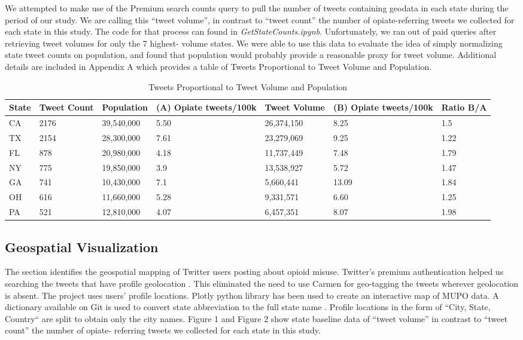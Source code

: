 \documentclass[sigconf]{acmart}
\begin{document}
We attempted to make use of the Premium search counts query to pull the number 
of tweets containing geodata in each state during the period of our study. 
We are calling this ``tweet volume'', in contrast to ``tweet count'' the number 
of opiate-referring tweets we collected for each state in this study. The code 
for that process can found in \emph{GetStateCounts.ipynb}. Unfortunately, we 
ran out of paid queries after retrieving tweet volumes for only the 7 highest-
volume states. We were able to use this data to evaluate the idea of simply 
normalizing state tweet counts on population, and found that population would 
probably provide a reasonable proxy for tweet volume. Additional details are 
included in Appendix A which provides a table of Tweets Proportional to Tweet 
Volume and Population.

\begin{table}[ht]
\centering
\caption{Tweets Proportional to Tweet Volume and Population}
\label{tab:1}
  \begin{tabular}{lllllll}
    \toprule
    State & Tweet Count & Population & (A) Opiate tweets/100k & Tweet Volume & 
    (B) Opiate tweets/100k & Ratio B/A \\
    \midrule     
    CA& 2176& 39,540,000& 5.50& 26,374,150& 8.25& 1.5 \\
    TX& 2154& 28,300,000& 7.61& 23,279,069& 9.25& 1.22 \\
    FL& 878& 20,980,000& 4.18& 11,737,449& 7.48& 1.79 \\
    NY& 775& 19,850,000& 3.9& 13,538,927& 5.72& 1.47 \\
    GA& 741& 10,430,000& 7.1& 5,660,441& 13.09& 1.84 \\
    OH& 616& 11,660,000& 5.28& 9,331,571& 6.60 & 1.25 \\
    PA& 521& 12,810,000& 4.07& 6,457,351& 8.07& 1.98 \\	
    \bottomrule
  \end{tabular}
\end{table}



\subsection{Geospatial Visualization}

The section identifies the geospatial mapping of Twitter users posting about 
opioid misuse. Twitter’s premium authentication helped us searching the tweets 
that have profile geolocation \cite{twittergeo}. This eliminated the need to 
use Carmen \cite{dredze13} for geo-tagging the tweets wherever geolocation is 
absent. The project uses users’ profile locations. Plotly python library has 
been used to create an interactive map of MUPO data. A dictionary available 
on Git is used to convert state abbreviation to the full state name 
\cite{CodeRef1}. Profile locations in the form of “City, State, Country“ are 
split to obtain only the city names. Figure 1 and Figure 2 show state baseline 
data of “tweet volume” in contrast to “tweet count” the number of opiate-
referring tweets we collected for each state in this study. 
\end{document}
